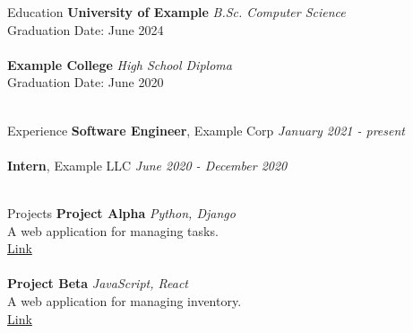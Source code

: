 \documentclass{resume} %
\begin{document}

                        \begin{rSection}{Education}
                        {\bf University of Example} \hfill {\em B.Sc. Computer Science} \\ 
Graduation Date: June 2024 \\ 
\\ 
{\bf Example College} \hfill {\em High School Diploma} \\ 
Graduation Date: June 2020 \\ 
\\ 

                        \end{rSection}

                        \begin{rSection}{Experience}
                        {\bf Software Engineer}, Example Corp \hfill {\em January 2021 - present} \\ 
\\ 
{\bf Intern}, Example LLC \hfill {\em June 2020 - December 2020} \\ 
\\ 

                        \end{rSection}

                        \begin{rSection}{Projects}
                        {\bf Project Alpha} \hfill {\em Python, Django} \\ 
A web application for managing tasks. \\ 
\href{https://github.com/johndoe/project-alpha}{Link} \\ 
\\ 
{\bf Project Beta} \hfill {\em JavaScript, React} \\ 
A web application for managing inventory. \\ 
\href{https://github.com/johndoe/project-alpha}{Link} \\ 
\\ 

                        \end{rSection}
\end{document}

